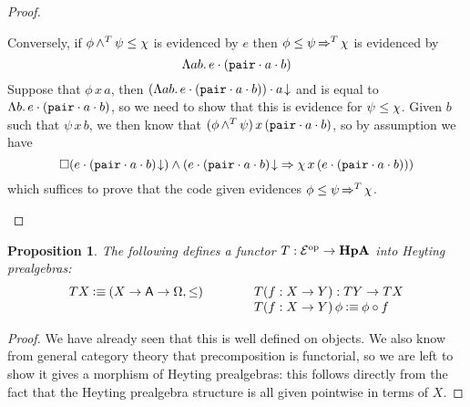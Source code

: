 \documentclass[11pt]{article}
\newtheorem{prop}[thrm]{Proposition}
\begin{document}
\begin{proof}
\begin{itemize}
      Conversely, if \({{\phi}\mathop{{\land^{T}}}{\psi}}\leq{\chi}\) is evidenced by \(e\)
      then \({\phi}\leq{{\psi}\mathop{\Rightarrow^{T}}{\chi}}\) is evidenced by
      \[
        \Lambda{ab}.\,{{e}\cdot{({{\texttt{pair}}\cdot{a}}\cdot{b})}}
      \]
      Suppose that \(\phi\,x\,a\), then \({{{(\Lambda{ab}.\,{{e}\cdot{({{\texttt{pair}}\cdot{a}}\cdot{b})}})}\cdot{a}}\!\downarrow}\)
      and is equal to \(\Lambda{b}.\,{{e}\cdot{({{\texttt{pair}}\cdot{a}}\cdot{b})}}\),
      so we need to show that this is evidence for \({\psi}\leq{\chi}\).
      Given \(b\) such that \(\psi\,x\,b\), we then know that
      \(({\phi}\mathop{{\land^{T}}}{\psi})\,x\,({{\texttt{pair}}\cdot{a}}\cdot{b})\), so
      by assumption we have
      \[
      \IAnd%
      {\IBox{(\ITotal{\IAp{e}{(\IAp{\IAp{\IPairCode}{a}}{b})}})}}%
      {(\IImplies%
      {\ITotal{\IAp{e}{(\IAp{\IAp{\IPairCode}{a}}{b})}}}%
      {\chi\,x\,(\IAp{e}{(\IAp{\IAp{\IPairCode}{a}}{b})})})%
      }
      \]
      which suffices to prove that the code given evidences
      \({\phi}\leq{{\psi}\mathop{\Rightarrow^{T}}{\chi}}\).
  \end{itemize}
\end{proof}

\begin{prop}
  The following defines a functor \(T : {\mathcal{E}}^\text{op} \to \textbf{HpA}\) into Heyting
  prealgebras:
  \[\begin{array}{lll}
    {T{X}} \mathbin{\vcentcolon\equiv} {({{X}\to{{{\ensuremath{\mathsf{A}}}\to{\Omega}}}}, \leq)}&\qquad&
    {T{(f:X\to Y)}} : T{Y} \to T{X}\\
    &&{T{(f:X\to Y)}\,\phi} \mathbin{\vcentcolon\equiv} {\phi \circ f}
  \end{array}\]
\end{prop}
\begin{proof}
  We have already seen that this is well defined on objects.
  We also know from general category theory that precomposition is functorial,
  so we are left to show it gives a morphism of Heyting prealgebras:
  this follows directly from the fact that the Heyting prealgebra structure is
  all given pointwise in terms of \(X\).
\end{proof}
\end{document}
